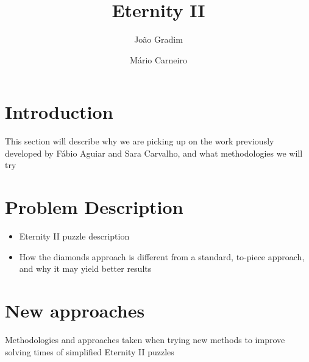 \documentclass{llncs}
\begin{document}
%
\frontmatter          %
%
\pagestyle{headings}  %
%

\mainmatter              %
%
\title{Eternity II}
%
%
\author{João Gradim \and Mário Carneiro}
%
%
%

\maketitle              %

\begin{abstract}
\end{abstract}
%
\section{Introduction}

This section will describe why we are picking up on the work previously developed by Fábio Aguiar and Sara Carvalho, and what methodologies we will try

\section{Problem Description}

\begin{itemize}
	\item Eternity II puzzle description
	\item How the diamonds approach is different from a standard, to-piece approach, and why it may yield better results
\end{itemize}

\section{New approaches}

Methodologies and approaches taken when trying new methods to improve solving times of simplified Eternity II puzzles
\end{document}
